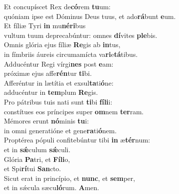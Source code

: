 \oddverse Et concupíscet Rex de\textbf{có}rem \textbf{tu}um:~\*\\
\oddverse quóniam ipse est Dóminus Deus tuus, et ado\textbf{rá}bunt \textbf{e}um.\\
\evenverse Et fíliæ Tyri \textbf{in} mu\textbf{né}\textbf{ri}bus~\*\\
\evenverse vultum tuum deprecabúntur: omnes \textbf{dí}vites \textbf{ple}bis.\\
\oddverse Omnis glória ejus fíliæ \textbf{Re}gis ab \textbf{in}tus,~\*\\
\oddverse in fímbriis áureis circumamícta va\textbf{ri}e\textbf{tá}tibus.\\
\evenverse Adducéntur Regi vírgi\textbf{nes} post \textbf{e}am:~\*\\
\evenverse próximæ ejus affe\textbf{rén}tur \textbf{ti}bi.\\
\oddverse Afferéntur in lætítia et exsul\textbf{ta}ti\textbf{ó}ne:~\*\\
\oddverse adducéntur in \textbf{tem}plum \textbf{Re}gis.\\
\evenverse Pro pátribus tuis nati sunt \textbf{ti}bi \textbf{fí}\textbf{li}i:~\*\\
\evenverse constítues eos príncipes super \textbf{om}nem \textbf{ter}ram.\\
\oddverse Mémores erunt \textbf{nó}minis \textbf{tu}i:~\*\\
\oddverse in omni generatióne et gene\textbf{ra}ti\textbf{ó}nem.\\
\evenverse Proptérea pópuli confitebúntur tibi \textbf{in} æ\textbf{tér}num:~\*\\
\evenverse et in \textbf{sǽ}culum \textbf{sǽ}culi.\\
\oddverse Glória \textbf{Pa}tri, et \textbf{Fí}\textbf{li}o,~\*\\
\oddverse et Spi\textbf{rí}tui \textbf{San}cto.\\
\evenverse Sicut erat in princípio, et \textbf{nunc}, et \textbf{sem}per,~\*\\
\evenverse et in sǽcula sæcu\textbf{ló}rum. \textbf{A}men.\\
